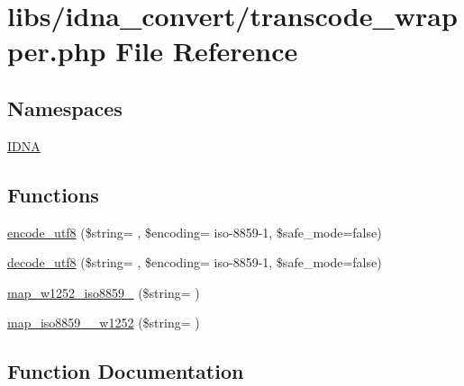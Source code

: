 \hypertarget{transcode__wrapper_8php}{}\section{libs/idna\+\_\+convert/transcode\+\_\+wrapper.php File Reference}
\label{transcode__wrapper_8php}
\subsection*{Namespaces}
\begin{DoxyCompactItemize}
\item 
 \hyperlink{namespaceIDNA}{I\+D\+NA}
\end{DoxyCompactItemize}
\subsection*{Functions}
\begin{DoxyCompactItemize}
\item 
\hyperlink{transcode__wrapper_8php_a2ff254e88e75a9b65a7f7ed6701d9307}{encode\+\_\+utf8} (\$string= \textquotesingle{}\textquotesingle{}, \$encoding= \textquotesingle{}iso-\/8859-\/1\textquotesingle{}, \$safe\+\_\+mode=false)
\item 
\hyperlink{transcode__wrapper_8php_ad2fd4d69808391b53e99415b7e7d593b}{decode\+\_\+utf8} (\$string= \textquotesingle{}\textquotesingle{}, \$encoding= \textquotesingle{}iso-\/8859-\/1\textquotesingle{}, \$safe\+\_\+mode=false)
\item 
\hyperlink{transcode__wrapper_8php_aa7960d121ac08a7136632119e2c7f9ff}{map\+\_\+w1252\+\_\+iso8859\+\_} (\$string= \textquotesingle{}\textquotesingle{})
\item 
\hyperlink{transcode__wrapper_8php_a4ef1158fdfc9dfbb47a3642cc16fe19b}{map\+\_\+iso8859\+\_\+\_\+w1252} (\$string= \textquotesingle{}\textquotesingle{})
\end{DoxyCompactItemize}


\subsection{Function Documentation}
